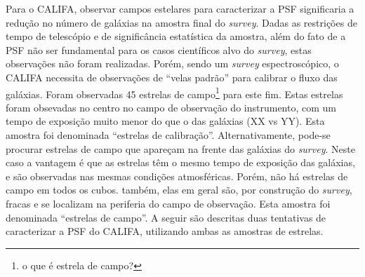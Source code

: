 Para o CALIFA, observar campos estelares para caracterizar a PSF significaria a
redução no número de galáxias na amostra final do {\em survey}. Dadas as
restrições de tempo de telescópio e de significância estatística da amostra,
além do fato de a PSF não ser fundamental para os casos científicos alvo do
{\em survey}, estas observações não foram realizadas. Porém, sendo um {\em
survey} espectroscópico, o CALIFA necessita de observações de ``velas padrão''
para calibrar o fluxo das galáxias. Foram observadas 45 estrelas de
campo\footnote{o que é estrela de campo?} para este fim. Estas estrelas foram
obsevadas no centro no campo de observação do instrumento, com um tempo de
exposição muito menor do que o das galáxias (XX vs YY\fixme). Esta amostra foi
denominada ``estrelas de calibração''. Alternativamente, pode-se procurar
estrelas de campo que apareçam na frente das galáxias do {\em survey}.
Neste caso a vantagem é que as estrelas têm o mesmo tempo de exposição das
galáxias, e são observadas nas mesmas condições atmosféricas. Porém, não há
estrelas de campo em todos os cubos. também, elas em geral são, por construção
do {\em survey}, fracas e se localizam na periferia do campo de observação.
Esta amostra foi denominada ``estrelas de campo''. A seguir são descritas
duas tentativas de caracterizar a PSF do CALIFA, utilizando ambas as
amostras de estrelas.


